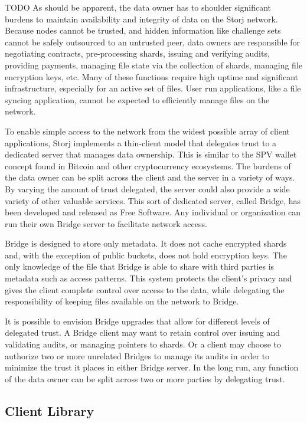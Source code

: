 \documentclass[a4paper,10pt]{article}
\newcommand{\todo}[1]{{\color{red} TODO #1}}
\begin{document}
\todo{
As should be apparent, the data owner has to shoulder significant burdens to
maintain availability and integrity of data on the Storj network. Because nodes
cannot be trusted, and hidden information like challenge sets cannot be safely
outsourced to an untrusted peer, data owners are responsible for negotiating
contracts, pre-processing shards, issuing and verifying audits, providing
payments, managing file state via the collection of shards, managing file
encryption keys, etc. Many of these functions require high uptime and
significant infrastructure, especially for an active set of files. User run
applications, like a file syncing application, cannot be expected to efficiently
manage files on the network.

To enable simple access to the network from the widest possible array of client
applications, Storj implements a thin-client model that delegates trust to a
dedicated server that manages data ownership. This is similar to the SPV wallet
concept found in Bitcoin and other cryptocurrency ecosystems. The burdens of the
data owner can be split across the client and the server in a variety of ways.
By varying the amount of trust delegated, the server could also provide a wide
variety of other valuable services. This sort of dedicated server, called
Bridge, has been developed and released as Free Software. Any individual or
organization can run their own Bridge server to facilitate network access.

Bridge is designed to store only metadata. It does not cache encrypted shards
and, with the exception of public buckets, does not hold encryption keys. The
only knowledge of the file that Bridge is able to share with third parties is
metadata such as access patterns. This system protects the client's privacy and
gives the client complete control over access to the data, while delegating the
responsibility of keeping files available on the network to Bridge.

It is possible to envision Bridge upgrades that allow for different levels of
delegated trust. A Bridge client may want to retain control over issuing and
validating audits, or managing pointers to shards. Or a client may choose to
authorize two or more unrelated Bridges to manage its audits in order to
minimize the trust it places in either Bridge server. In the long run, any
function of the data owner can be split across two or more parties by delegating
trust.
}

\subsection{Client Library}
\end{document}
